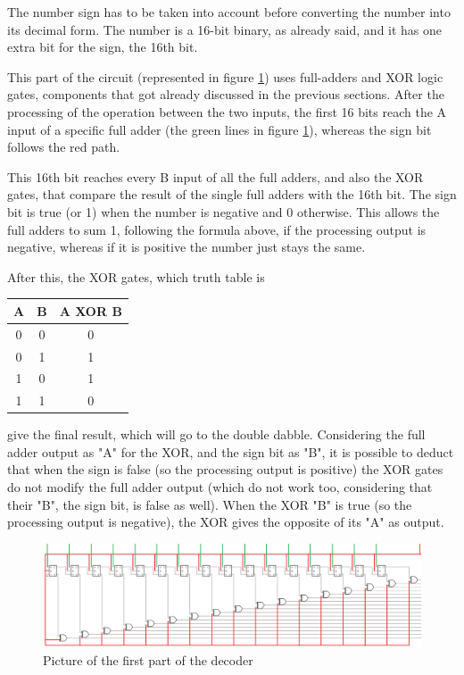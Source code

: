 \documentclass{article}
\begin{document}
The number sign has to be taken into account before converting the number into its decimal form. The number is a 16-bit binary, as already said, and it has one extra bit for the sign, the 16th bit.


This part of the circuit (represented in figure \ref{Converter}) uses full-adders and XOR logic gates, components that got already discussed in the previous sections. After the processing of the operation between the two inputs, the first 16 bits reach the A input of a specific full adder (the green lines in figure \ref{Converter}), whereas the sign bit follows the red path.

This 16th bit reaches every B input of all the full adders, and also the XOR gates, that compare the result of the single full adders with the 16th bit. The sign bit is true (or 1) when the number is negative and 0 otherwise. This allows the full adders to sum 1, following the formula above, if the processing output is negative, whereas if it is positive the number just stays the same.

After this, the XOR gates, which truth table is 
\begin{center}
\begin{tabular}{||c|c||c||}
    \hline
    A & B & A XOR B \\
    \hline
    0 & 0 & 0 \\
    \hline
    0 & 1 & 1 \\
    \hline
    1 & 0 & 1 \\
    \hline
    1 & 1 & 0 \\
    \hline
\end{tabular}
\end{center}

give the final result, which will go to the double dabble. Considering the full adder output as "A" for the XOR, and the sign bit as "B", it is possible to deduct that when the sign is false (so the processing output is positive) the XOR gates do not modify the full adder output (which do not work too, considering that their "B", the sign bit, is false as well). When the XOR "B" is true (so the processing output is negative), the XOR gives the opposite of its "A" as output.

\begin{figure}[h]
    \centering
    \includegraphics[scale=0.43]{SC_Converter.PNG}
    \caption{Picture of the first part of the decoder}
    \label{Converter}
  \end{figure}
\end{document}
